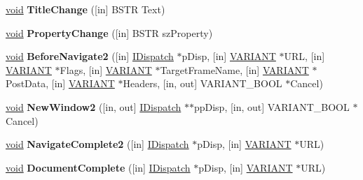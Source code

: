 \begin{DoxyCompactItemize}
\hyperlink{interfacevoid}{void} {\bfseries Title\+Change} (\mbox{[}in\mbox{]} B\+S\+TR Text)
\item 
\mbox{\label{interface_s_h_doc_vw_1_1_d_web_browser_events2_ad301f94ff3ecefad0f02b2351c97a43a}} 
\hyperlink{interfacevoid}{void} {\bfseries Property\+Change} (\mbox{[}in\mbox{]} B\+S\+TR sz\+Property)
\item 
\mbox{\label{interface_s_h_doc_vw_1_1_d_web_browser_events2_adff1f2c69bc92b4fc2ac7b1c1083cdbd}} 
\hyperlink{interfacevoid}{void} {\bfseries Before\+Navigate2} (\mbox{[}in\mbox{]} \hyperlink{interface_i_dispatch}{I\+Dispatch} $\ast$p\+Disp, \mbox{[}in\mbox{]} \hyperlink{structtag_v_a_r_i_a_n_t}{V\+A\+R\+I\+A\+NT} $\ast$U\+RL, \mbox{[}in\mbox{]} \hyperlink{structtag_v_a_r_i_a_n_t}{V\+A\+R\+I\+A\+NT} $\ast$Flags, \mbox{[}in\mbox{]} \hyperlink{structtag_v_a_r_i_a_n_t}{V\+A\+R\+I\+A\+NT} $\ast$Target\+Frame\+Name, \mbox{[}in\mbox{]} \hyperlink{structtag_v_a_r_i_a_n_t}{V\+A\+R\+I\+A\+NT} $\ast$Post\+Data, \mbox{[}in\mbox{]} \hyperlink{structtag_v_a_r_i_a_n_t}{V\+A\+R\+I\+A\+NT} $\ast$Headers, \mbox{[}in, out\mbox{]} V\+A\+R\+I\+A\+N\+T\+\_\+\+B\+O\+OL $\ast$Cancel)
\item 
\mbox{\label{interface_s_h_doc_vw_1_1_d_web_browser_events2_a0cb0ef59fc57a92f73eb2257cda151cf}} 
\hyperlink{interfacevoid}{void} {\bfseries New\+Window2} (\mbox{[}in, out\mbox{]} \hyperlink{interface_i_dispatch}{I\+Dispatch} $\ast$$\ast$pp\+Disp, \mbox{[}in, out\mbox{]} V\+A\+R\+I\+A\+N\+T\+\_\+\+B\+O\+OL $\ast$Cancel)
\item 
\mbox{\label{interface_s_h_doc_vw_1_1_d_web_browser_events2_afe5c1c2f34852095a93d1823718d166c}} 
\hyperlink{interfacevoid}{void} {\bfseries Navigate\+Complete2} (\mbox{[}in\mbox{]} \hyperlink{interface_i_dispatch}{I\+Dispatch} $\ast$p\+Disp, \mbox{[}in\mbox{]} \hyperlink{structtag_v_a_r_i_a_n_t}{V\+A\+R\+I\+A\+NT} $\ast$U\+RL)
\item 
\mbox{\label{interface_s_h_doc_vw_1_1_d_web_browser_events2_a4423ac3d09dc033e6491b0a8014a9da6}} 
\hyperlink{interfacevoid}{void} {\bfseries Document\+Complete} (\mbox{[}in\mbox{]} \hyperlink{interface_i_dispatch}{I\+Dispatch} $\ast$p\+Disp, \mbox{[}in\mbox{]} \hyperlink{structtag_v_a_r_i_a_n_t}{V\+A\+R\+I\+A\+NT} $\ast$U\+RL)
$$
\end{DoxyCompactItemize}
